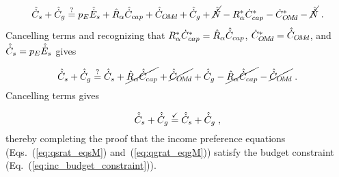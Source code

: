 \begin{equation}
  \hat{\dot{C}}_s + \hat{\dot{C}}_g \stackrel{?}{=} p_E \hat{\dot{E}}_s + \hat{R}_\alpha \hat{\dot{C}}_{cap} + \hat{\dot{C}}_{O\!M\!d} + \hat{\dot{C}}_g + \cancel{\hat{\dot{N}}}
    - {R}^*_\alpha {\dot{C}}^*_{cap} - {\dot{C}}^*_{O\!M\!d} - \cancel{\hat{\dot{N}}} \; .
\end{equation}
%
Cancelling terms and recognizing that ${R}^*_\alpha {\dot{C}}^*_{cap} = \hat{R}_\alpha \hat{\dot{C}}_{cap}$, ${\dot{C}}^*_{O\!M\!d} = \hat{\dot{C}}_{O\!M\!d}$, and
$\hat{\dot{C}}_s = p_E \hat{\dot{E}}_s$ gives

\begin{equation}
  \hat{\dot{C}}_s + \hat{\dot{C}}_g \stackrel{?}{=} \hat{\dot{C}}_s + \cancel{\hat{R}_\alpha \hat{\dot{C}}_{cap}} + \cancel{\hat{\dot{C}}_{O\!M\!d}} + \hat{\dot{C}}_g
        - \cancel{\hat{R}_\alpha \hat{\dot{C}}_{cap}} - \cancel{\hat{\dot{C}}_{O\!M\!d}} \; .
\end{equation}
%
Cancelling terms gives

\begin{equation}
  \hat{\dot{C}}_s + \hat{\dot{C}}_g \stackrel{\checkmark}{=} \hat{\dot{C}}_s + \hat{\dot{C}}_g \; ,
\end{equation}
%
thereby completing the proof that the income preference equations
(Eqs.~(\ref{eq:qsrat_eqsM}) and~(\ref{eq:qgrat_eqgM}))
satisfy the budget constraint
(Eq.~(\ref{eq:inc_budget_constraint})).
